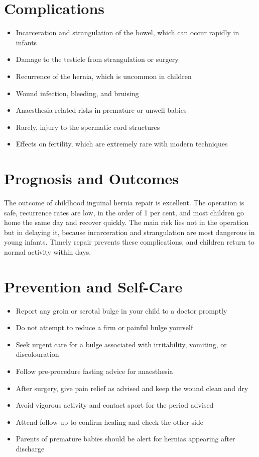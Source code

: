 \section*{Complications}
\begin{itemize}
    \item Incarceration and strangulation of the bowel, which can occur rapidly in infants
    \item Damage to the testicle from strangulation or surgery
    \item Recurrence of the hernia, which is uncommon in children
    \item Wound infection, bleeding, and bruising
    \item Anaesthesia-related risks in premature or unwell babies
    \item Rarely, injury to the spermatic cord structures
    \item Effects on fertility, which are extremely rare with modern techniques
\end{itemize}

\section*{Prognosis and Outcomes}
The outcome of childhood inguinal hernia repair is excellent. The operation is safe, recurrence rates are low, in the order of 1 per cent, and most children go home the same day and recover quickly. The main risk lies not in the operation but in delaying it, because incarceration and strangulation are most dangerous in young infants. Timely repair prevents these complications, and children return to normal activity within days.

\section*{Prevention and Self-Care}
\begin{itemize}
    \item Report any groin or scrotal bulge in your child to a doctor promptly
    \item Do not attempt to reduce a firm or painful bulge yourself
    \item Seek urgent care for a bulge associated with irritability, vomiting, or discolouration
    \item Follow pre-procedure fasting advice for anaesthesia
    \item After surgery, give pain relief as advised and keep the wound clean and dry
    \item Avoid vigorous activity and contact sport for the period advised
    \item Attend follow-up to confirm healing and check the other side
    \item Parents of premature babies should be alert for hernias appearing after discharge
\end{itemize}

